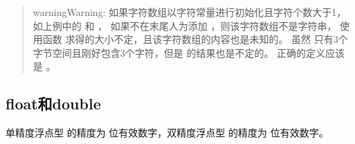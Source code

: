 \documentclass[letterpaper,10pt,english]{sphinxmanual}
\begin{document}
\begin{enumerate}
\begin{quote}
\begin{sphinxadmonition}{warning}{Warning:}
如果字符数组以字符常量进行初始化且字符个数大于1，如上例中的  和  ，
如果不在末尾人为添加  ，则该字符数组不是字符串，
使用函数  求得的大小不定，且该字符数组的内容也是未知的。
虽然  只有3个字节空间且刚好包含3个字符，但是  的结果也是不定的。
正确的定义应该是  。
\end{sphinxadmonition}
\end{quote}

\end{enumerate}


\subsection{float和double}
\label{\detokenize{cpp/03_typeSize:floatdouble}}
单精度浮点型  的精度为  位有效数字，双精度浮点型  的精度为  位有效数字。
\end{document}
